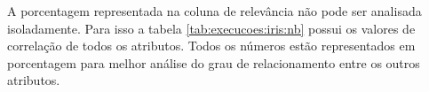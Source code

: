 A porcentagem representada na coluna de relevância não pode ser analisada isoladamente. Para isso  a tabela \ref{tab:execucoes:iris:nb} possui os valores de correlação de todos os atributos. Todos os números estão representados em porcentagem para melhor análise do grau de relacionamento entre os outros atributos.
% 
% 
%   
%  
%    
